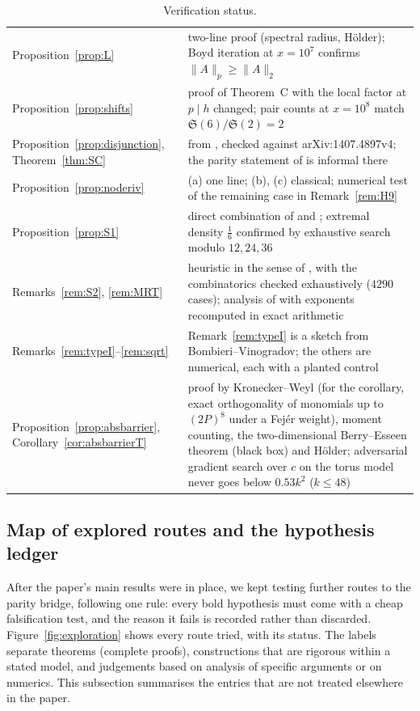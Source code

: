 \begin{table}[H]
\begin{tabular}{p{3.4cm}p{9.2cm}}
Proposition~\ref{prop:L} & two-line proof (spectral radius, Hölder); Boyd iteration at $x=10^7$ confirms $\|A\|_p\ge\|A\|_2$\\
Proposition~\ref{prop:shifts} & proof of Theorem~C with the local factor at $p\mid h$ changed; pair counts at $x=10^8$ match $\mathfrak S(6)/\mathfrak S(2)=2$\\
Proposition~\ref{prop:disjunction}, Theorem~\ref{thm:SC} & from \cite[Lemma~3.4, Thm.~3.2(xii), Table~1]{Polymath8b}, checked against arXiv:1407.4897v4; the parity statement of \cite[\S8]{Polymath8b} is informal there\\
Proposition~\ref{prop:noderiv} & (a) one line; (b), (c) classical; numerical test of the remaining case in Remark~\ref{rem:H9}\\
Proposition~\ref{prop:S1} & direct combination of \cite[Thm.~3.2(xii)]{Polymath8b} and \cite[Prop.~2.1]{GKKL15}; extremal density $\frac16$ confirmed by exhaustive search modulo $12,24,36$\\
Remarks~\ref{rem:S2}, \ref{rem:MRT} & heuristic in the sense of \cite[\S8]{Polymath8b}, with the combinatorics checked exhaustively ($4290$ cases); analysis of \cite[\S\S7--8]{MRT19} with exponents recomputed in exact arithmetic\\
Remarks~\ref{rem:typeI}--\ref{rem:sqrt} & Remark~\ref{rem:typeI} is a sketch from Bombieri--Vinogradov; the others are numerical, each with a planted control\\
Proposition~\ref{prop:absbarrier}, Corollary~\ref{cor:absbarrierT} & proof by Kronecker--Weyl (for the corollary, exact orthogonality of monomials up to $(2P)^8$ under a Fejér weight), moment counting, the two-dimensional Berry--Esseen theorem \cite{Ben05} (black box) and Hölder; adversarial gradient search over $c$ on the torus model never goes below $0.53k^2$ ($k\le48$)\\
\bottomrule
\end{tabular}
\caption{Verification status.}
\label{tab:verify}
\end{table}

\subsection{Map of explored routes and the hypothesis ledger}\label{sec:explored}
After the paper's main results were in place, we kept testing further routes to the parity bridge, following one rule: every bold hypothesis must come with a cheap falsification test, and the reason it fails is recorded rather than discarded. Figure~\ref{fig:exploration} shows every route tried, with its status. The labels separate theorems (complete proofs), constructions that are rigorous within a stated model, and judgements based on analysis of specific arguments or on numerics. This subsection summarises the entries that are not treated elsewhere in the paper.

